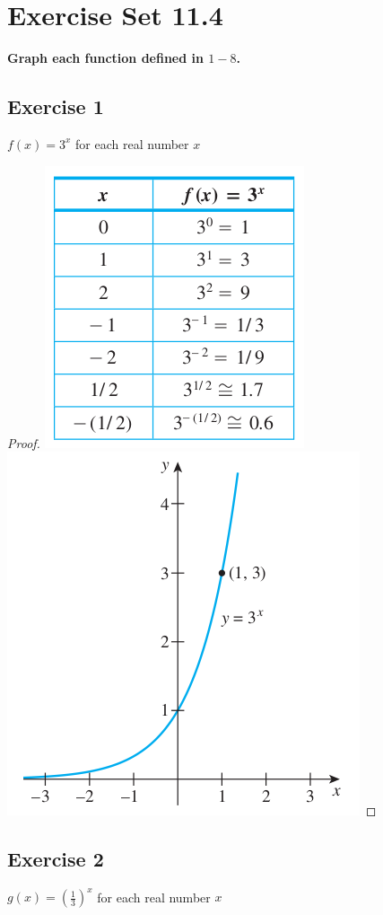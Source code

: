 \documentclass[14pt]{extarticle}
\newcommand{\cy}{\color{cyan}}
\begin{document}
\section{Exercise Set 11.4}
{\bf \cy Graph each function defined in \(1-8\).}

\subsection{Exercise 1}
\(f(x) = 3^x\) for each real number \(x\)

\begin{proof}
\includegraphics[scale=0.5]{../images/11.4.1.1.png}
\includegraphics[scale=0.5]{../images/11.4.1.2.png}
\end{proof}

\subsection{Exercise 2}
\(g(x) = \left(\frac{1}{3}\right)^x\) for each real number \(x\)
\end{document}
